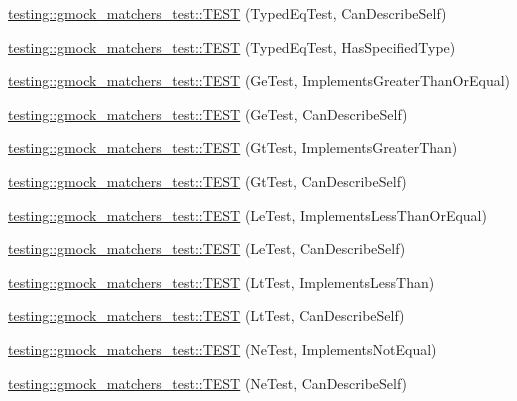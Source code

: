 \begin{DoxyCompactItemize}
\item 
\hyperlink{namespacetesting_1_1gmock__matchers__test_a9baf261536023ac58ed65cdafcaf1602}{testing\+::gmock\+\_\+matchers\+\_\+test\+::\+T\+E\+ST} (Typed\+Eq\+Test, Can\+Describe\+Self)
\item 
\hyperlink{namespacetesting_1_1gmock__matchers__test_ae0255a5de2ef537512379c3f8ff9e34f}{testing\+::gmock\+\_\+matchers\+\_\+test\+::\+T\+E\+ST} (Typed\+Eq\+Test, Has\+Specified\+Type)
\item 
\hyperlink{namespacetesting_1_1gmock__matchers__test_a7d73fdbbee36ccf241ec6e328175655b}{testing\+::gmock\+\_\+matchers\+\_\+test\+::\+T\+E\+ST} (Ge\+Test, Implements\+Greater\+Than\+Or\+Equal)
\item 
\hyperlink{namespacetesting_1_1gmock__matchers__test_a2718c8d5456b62ab7b060b2723939a72}{testing\+::gmock\+\_\+matchers\+\_\+test\+::\+T\+E\+ST} (Ge\+Test, Can\+Describe\+Self)
\item 
\hyperlink{namespacetesting_1_1gmock__matchers__test_a87a9ac189a12e0b85964f03b3b9998b1}{testing\+::gmock\+\_\+matchers\+\_\+test\+::\+T\+E\+ST} (Gt\+Test, Implements\+Greater\+Than)
\item 
\hyperlink{namespacetesting_1_1gmock__matchers__test_a2981bbdbf9cbd8864a6dde4ff4b06050}{testing\+::gmock\+\_\+matchers\+\_\+test\+::\+T\+E\+ST} (Gt\+Test, Can\+Describe\+Self)
\item 
\hyperlink{namespacetesting_1_1gmock__matchers__test_af0cd1cfc3ff1272bfe06f31c5eb3ab8b}{testing\+::gmock\+\_\+matchers\+\_\+test\+::\+T\+E\+ST} (Le\+Test, Implements\+Less\+Than\+Or\+Equal)
\item 
\hyperlink{namespacetesting_1_1gmock__matchers__test_a463bc4f6cdca489c05ad691e1254e2f3}{testing\+::gmock\+\_\+matchers\+\_\+test\+::\+T\+E\+ST} (Le\+Test, Can\+Describe\+Self)
\item 
\hyperlink{namespacetesting_1_1gmock__matchers__test_a9f332401730e637d5c3923924dc339e3}{testing\+::gmock\+\_\+matchers\+\_\+test\+::\+T\+E\+ST} (Lt\+Test, Implements\+Less\+Than)
\item 
\hyperlink{namespacetesting_1_1gmock__matchers__test_ae29bb32c74970fc22e7ac5d86e7e6c26}{testing\+::gmock\+\_\+matchers\+\_\+test\+::\+T\+E\+ST} (Lt\+Test, Can\+Describe\+Self)
\item 
\hyperlink{namespacetesting_1_1gmock__matchers__test_a7319f919e57cf349f733bbdb56177daf}{testing\+::gmock\+\_\+matchers\+\_\+test\+::\+T\+E\+ST} (Ne\+Test, Implements\+Not\+Equal)
\item 
\hyperlink{namespacetesting_1_1gmock__matchers__test_a8a743510a5256803d75c2d7735ec515a}{testing\+::gmock\+\_\+matchers\+\_\+test\+::\+T\+E\+ST} (Ne\+Test, Can\+Describe\+Self)

\end{DoxyCompactItemize}
